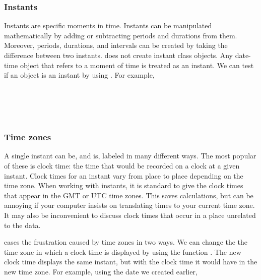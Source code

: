 \documentclass[article]{jss}
\begin{document}
\subsubsection{Instants}
\label{sec:instants}

Instants are specific moments in time. Instants can be manipulated mathematically by adding or subtracting periods and durations from them. Moreover, periods, durations, and intervals can be created by taking the difference between two instants.  does not create instant class objects. Any date-time object that refers to a moment of time is treated as an instant. We can test if an object is an instant by using . For example,\\

\\
\\

\\
\\

\subsubsection{Time zones}
\label{sec:tz}

A single instant can be, and is, labeled in many different ways.  The most popular of these is clock time: the time that would be recorded on a clock at a given instant. Clock times for an instant vary from place to place depending on the time zone. When working with instants, it is standard to give the clock times that appear in the GMT or UTC time zones.  This saves calculations, but can be annoying if your computer insists on translating times to your current time zone.  It may also be inconvenient to discuss clock times that occur in a place unrelated to the data.

 eases the frustration caused by time zones in two ways. We can change the the time zone in which a clock time is displayed by using the function . The new clock time displays the same instant, but with the clock time it would have in the new time zone. For example, using the date we created earlier,\\

\\
\\
\\
\\
\end{document}
